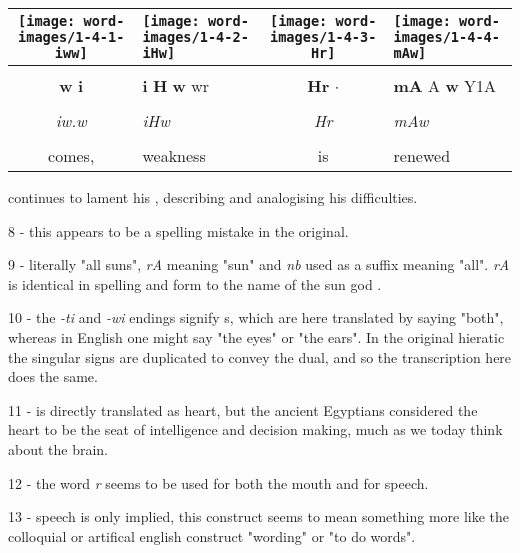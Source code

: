 \vspace{7.5mm}

\begin{tabularx}{\linewidth}{cYcY}
	\texttt{[image: word-images/1-4-1-iww]} &
	\texttt{[image: word-images/1-4-2-iHw]} &
	\texttt{[image: word-images/1-4-3-Hr]} &
	\texttt{[image: word-images/1-4-4-mAw]} \\
	\hline \\ 
	\textbf{w} \textbf{i}  &
	\textbf{i} \textbf{H} \textbf{w} wr &
	\textbf{Hr} $\cdot$ &
	\textbf{mA} A \textbf{w} Y1A \\
	\hline \\ 
	\textit{iw.w} & \textit{iHw} & \textit{Hr} & \textit{mAw} \\
	\hline \\ 
	comes, & weakness & is & renewed
\end{tabularx}

\vspace*{\fill}

\pagebreak

\vspace*{\fill}

 continues to lament his , describing and analogising his difficulties.

\vspace*{\fill}

8 - this appears to be a spelling mistake in the original.

9 - literally "all suns", \textit{rA} meaning "sun" and \textit{nb} used as a suffix meaning "all". \textit{rA} is identical in spelling and form to the name of the sun god .

10 - the \textit{-ti} and \textit{-wi} endings signify s, which are here translated by saying "both", whereas in English one might say "the eyes" or "the ears". In the original hieratic the singular signs are duplicated to convey the dual, and so the transcription here does the same.

11 - \textit{} is directly translated as heart, but the ancient Egyptians considered the heart to be the seat of intelligence and decision making, much as we today think about the brain.

12 - the word \textit{r} seems to be used for both the mouth and for speech.

13 - speech is only implied, this construct seems to mean something more like the colloquial or artifical english construct "wording" or "to do words".

